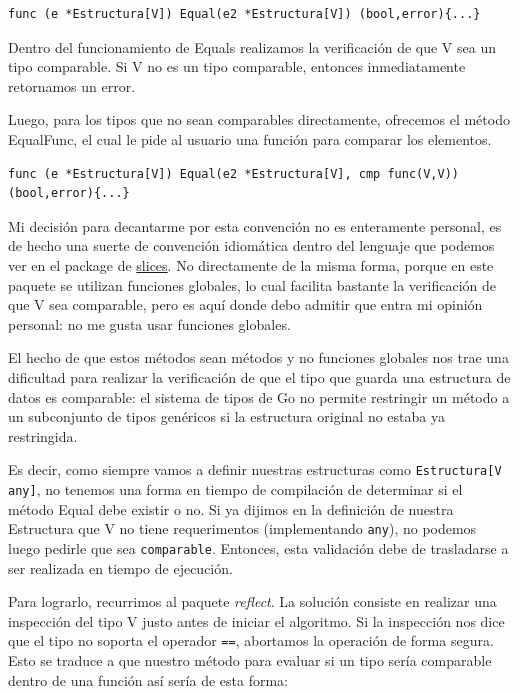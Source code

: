 \documentclass[11pt]{article}
\begin{document}
\begin{verbatim}
func (e *Estructura[V]) Equal(e2 *Estructura[V]) (bool,error){...}
\end{verbatim}

Dentro del funcionamiento de Equals realizamos la verificación de que V sea un tipo comparable. Si V no es un tipo comparable, entonces inmediatamente retornamos un error.

Luego, para los tipos que no sean comparables directamente, ofrecemos el método EqualFunc, el cual le pide al usuario una función para comparar los elementos.

\begin{verbatim}
func (e *Estructura[V]) Equal(e2 *Estructura[V], cmp func(V,V)) (bool,error){...}
\end{verbatim}

Mi decisión para decantarme por esta convención no es enteramente personal, es de hecho una suerte de convención idiomática dentro del lenguaje que podemos ver en el package de \href{https://pkg.go.dev/slices\#Equal}{slices}. No directamente de la misma forma, porque en este paquete se utilizan funciones globales, lo cual facilita bastante la verificación de que V sea comparable, pero es aquí donde debo admitir que entra mi opinión personal: no me gusta usar funciones globales.

El hecho de que estos métodos sean métodos y no funciones globales nos trae una dificultad para realizar la verificación de que el tipo que guarda una estructura de datos es comparable: el sistema de tipos de Go no permite restringir un método a un subconjunto de tipos genéricos si la estructura original no estaba ya restringida.

Es decir, como siempre vamos a definir nuestras estructuras como \texttt{Estructura[V any]}, no tenemos una forma en tiempo de compilación de determinar si el método Equal debe existir o no. Si ya dijimos en la definición de nuestra Estructura que V no tiene requerimentos (implementando \texttt{any}), no podemos luego pedirle que sea \texttt{comparable}. Entonces, esta validación debe de trasladarse a ser realizada en tiempo de ejecución.

Para lograrlo, recurrimos al paquete \emph{reflect}. La solución consiste en realizar una inspección del tipo V justo antes de iniciar el algoritmo. Si la inspección nos dice que el tipo no soporta el operador \texttt{==}, abortamos la operación de forma segura. Esto se traduce a que nuestro método para evaluar si un tipo sería comparable dentro de una función así sería de esta forma:
\end{document}
